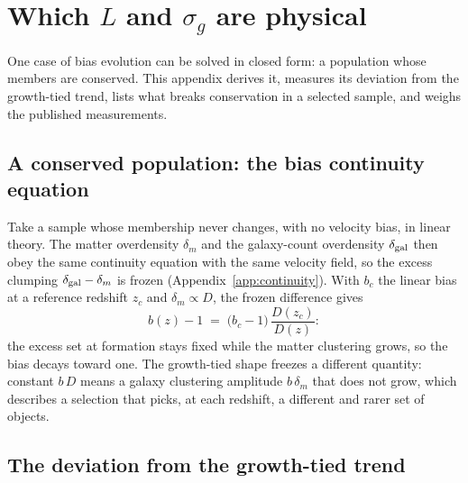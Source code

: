 \section{Which $L$ and $\sigma_g$ are physical}
\label{sec:physical}

One case of bias evolution can be solved in closed form: a population
whose members are conserved.  This appendix derives it, measures its
deviation from the growth-tied trend, lists what breaks conservation in
a selected sample, and weighs the published measurements.

\subsection{A conserved population: the bias continuity equation}
\label{sec:conserved}

Take a sample whose membership never changes, with no velocity bias,
in linear theory.  The matter overdensity $\delta_m$ and the
galaxy-count overdensity $\delta_{\rm gal}$ then obey the same
continuity equation with the same velocity field, so the excess
clumping $\delta_{\rm gal} - \delta_m$ is frozen
(Appendix~\ref{app:continuity}).  With $b_c$ the linear bias at a
reference redshift $z_c$ and $\delta_m \propto D$, the frozen
difference gives~\cite{Fry1996}
\begin{equation}
  b(z) - 1
  \;=\;
  \bigl(b_c - 1\bigr)\,\frac{D(z_c)}{D(z)} :
  \label{eq:fry}
\end{equation}
the excess set at formation stays fixed while the matter clustering
grows, so the bias decays toward one.  The growth-tied shape freezes a
different quantity: constant $b\,D$ means a galaxy clustering amplitude
$b\,\delta_m$ that does not grow, which describes a selection that
picks, at each redshift, a different and rarer set of objects.

\subsection{The deviation from the growth-tied trend}
\label{sec:tilt}

